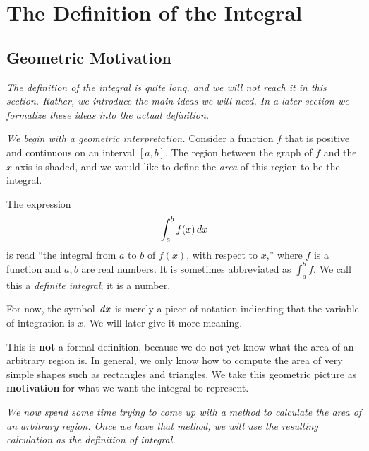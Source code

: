 \chapter{The Definition of the Integral}

\section{Geometric Motivation}
\label{sec:7.1}

\textit{The definition of the integral is quite long, and we will not reach it in this section.  Rather, we introduce the main ideas we will need.  In a later section we formalize these ideas into the actual definition.}

\textit{We begin with a geometric interpretation.}  Consider a function $f$ that is positive and continuous on an interval $[a,b]$.  The region between the graph of $f$ and the $x$-axis is shaded, and we would like to define the \emph{area} of this region to be the integral.

\begin{definition}
\label{def:7-1}
The expression
\[
  \int_{a}^{b} f(x)\,dx
\]
is read ``the integral from $a$ to $b$ of $f(x)$, with respect to $x$,'' where $f$ is a function and $a,b$ are real numbers.  It is sometimes abbreviated as $\int_{a}^{b} f$.  We call this a \emph{definite integral}; it is a number.
\end{definition}

\begin{remark}
For now, the symbol $\,dx$ is merely a piece of notation indicating that the variable of integration is $x$.  We will later give it more meaning.
\end{remark}

\begin{remark}[Warning]
This is \textbf{not} a formal definition, because we do not yet know what the area of an arbitrary region is.  In general, we only know how to compute the area of very simple shapes such as rectangles and triangles.  We take this geometric picture as \textbf{motivation} for what we want the integral to represent.
\end{remark}

\textit{We now spend some time trying to come up with a method to calculate the area of an arbitrary region.  Once we have that method, we will use the resulting calculation as the definition of integral.}

